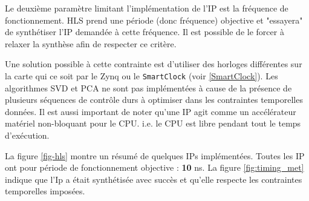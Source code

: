 \documentclass[12pt,a4paper]{article}
\begin{document}
Le deuxième paramètre limitant l'implémentation de l'IP est la fréquence de fonctionnement. HLS prend une période (donc fréquence) objective et "essayera" de synthétiser l'IP demandée à cette fréquence. Il est possible de le forcer à relaxer la synthèse afin de respecter ce critère.

Une solution possible à cette contrainte est d'utiliser des horloges différentes sur la carte qui ce soit par le Zynq ou le \texttt{SmartClock} (voir \ref{SmartClock}). Les algorithmes SVD et PCA ne sont pas implémentées à cause de la présence de plusieurs séquences de contrôle durs à optimiser dans les contraintes temporelles données. Il est aussi important de noter qu'une IP agit comme un accélérateur matériel non-bloquant pour le CPU. i.e. le CPU est libre pendant tout le temps d'exécution.

La figure \ref{fig-hls} montre un résumé de quelques IPs implémentées. Toutes les IP ont pour période de fonctionnement objective : \textbf{10} ns. La figure \ref{fig:timing_met} indique que l'Ip a était synthétisée avec succès et qu'elle respecte les contraintes temporelles imposées.
\end{document}
